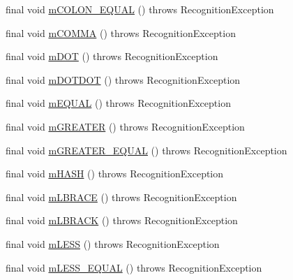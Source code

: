 \begin{DoxyCompactItemize}
\item 
final void \hyperlink{classorg_1_1tzi_1_1use_1_1parser_1_1generator_1_1_generator_lexer_aa36c537b23b1e3513e90b177c9fbca65}{m\-C\-O\-L\-O\-N\-\_\-\-E\-Q\-U\-A\-L} ()  throws Recognition\-Exception 
\item 
final void \hyperlink{classorg_1_1tzi_1_1use_1_1parser_1_1generator_1_1_generator_lexer_a1134b5edbbbb53d8b4d5e56b601b35c1}{m\-C\-O\-M\-M\-A} ()  throws Recognition\-Exception 
\item 
final void \hyperlink{classorg_1_1tzi_1_1use_1_1parser_1_1generator_1_1_generator_lexer_a29e5c2ca72e50644d30d491fd6905560}{m\-D\-O\-T} ()  throws Recognition\-Exception 
\item 
final void \hyperlink{classorg_1_1tzi_1_1use_1_1parser_1_1generator_1_1_generator_lexer_a8bd8fe476a2c9c88100433871e49c97a}{m\-D\-O\-T\-D\-O\-T} ()  throws Recognition\-Exception 
\item 
final void \hyperlink{classorg_1_1tzi_1_1use_1_1parser_1_1generator_1_1_generator_lexer_a883e1baf432c7e5a471a5e8c1eba4f9a}{m\-E\-Q\-U\-A\-L} ()  throws Recognition\-Exception 
\item 
final void \hyperlink{classorg_1_1tzi_1_1use_1_1parser_1_1generator_1_1_generator_lexer_adc29291f6ef2dc7861052a87edd6cc48}{m\-G\-R\-E\-A\-T\-E\-R} ()  throws Recognition\-Exception 
\item 
final void \hyperlink{classorg_1_1tzi_1_1use_1_1parser_1_1generator_1_1_generator_lexer_ab68a32ff437a559144dfaf4a0209cddc}{m\-G\-R\-E\-A\-T\-E\-R\-\_\-\-E\-Q\-U\-A\-L} ()  throws Recognition\-Exception 
\item 
final void \hyperlink{classorg_1_1tzi_1_1use_1_1parser_1_1generator_1_1_generator_lexer_a3f63dc82820e6ca5899527a2e85f8470}{m\-H\-A\-S\-H} ()  throws Recognition\-Exception 
\item 
final void \hyperlink{classorg_1_1tzi_1_1use_1_1parser_1_1generator_1_1_generator_lexer_a0e75ef4637f1d102b5b78b62c37818ae}{m\-L\-B\-R\-A\-C\-E} ()  throws Recognition\-Exception 
\item 
final void \hyperlink{classorg_1_1tzi_1_1use_1_1parser_1_1generator_1_1_generator_lexer_acfc14b182e1f2e480999a0f7af298f1d}{m\-L\-B\-R\-A\-C\-K} ()  throws Recognition\-Exception 
\item 
final void \hyperlink{classorg_1_1tzi_1_1use_1_1parser_1_1generator_1_1_generator_lexer_ac7546a150ac0c509a9c4c39348dfbae8}{m\-L\-E\-S\-S} ()  throws Recognition\-Exception 
\item 
final void \hyperlink{classorg_1_1tzi_1_1use_1_1parser_1_1generator_1_1_generator_lexer_abe99cdf5da10a8a0bfb2d8300a027aeb}{m\-L\-E\-S\-S\-\_\-\-E\-Q\-U\-A\-L} ()  throws Recognition\-Exception 

\end{DoxyCompactItemize}
